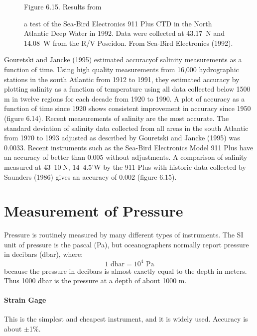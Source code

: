 \begin{figure}[b!]
\vspace{-4ex}
\footnotesize
Figure 6.15. Results from \rule{0pt}{3ex}a test of the Sea-Bird
Electronics 911 Plus CTD in the North Atlantic Deep
Water in 1992. Data were collected at
43.17\degrees\ N and 14.08\degrees\ W from the R/V Poseidon. From
Sea-Bird Electronics (1992).
\label{fig:911data}
\end{figure}

Gouretski and Jancke (1995) estimated
accuracyof
salinity measurements as a function of time. Using high quality
measurements from 16,000 hydrographic stations in the south Atlantic from 1912 to 1991,
they estimated accuracy by plotting salinity as a function of
temperature using all data collected below 1500 m in twelve regions
for each decade from 1920 to 1990. A plot of accuracy as a function of
time since 1920 shows consistent improvement in accuracy since 1950
(figure 6.14). Recent measurements of salinity are the most
accurate. The standard deviation of salinity data collected from all
areas in the south Atlantic from 1970 to 1993 adjusted as described by
Gouretski and Jancke (1995) was 0.0033. Recent instruments such as the
Sea-Bird Electronics Model 911 Plus have an
accuracy of better than 0.005 without
adjustments. A comparison of salinity measured at 43\degrees\ 10\'{}N,
14\degrees\ 4.5\'{}W by the 911 Plus with historic data collected by
Saunders (1986) gives an accuracy of 0.002 (figure 6.15).

\section{Measurement of Pressure}
Pressure is routinely measured by many
different types of instruments. The SI unit of pressure is the pascal
(Pa), but oceanographers normally report pressure in decibars (dbar),
where:
\begin{equation}
1 \text{ dbar} = 10^4 \text{ Pa}
\end{equation}
because the pressure in decibars is almost exactly equal to the depth
in meters.  Thus 1000 dbar is the pressure at a depth of about 1000 m.

\paragraph{Strain Gage}This is the simplest and
cheapest instrument, and it is widely
used. Accuracy is about $\pm$1\%.

